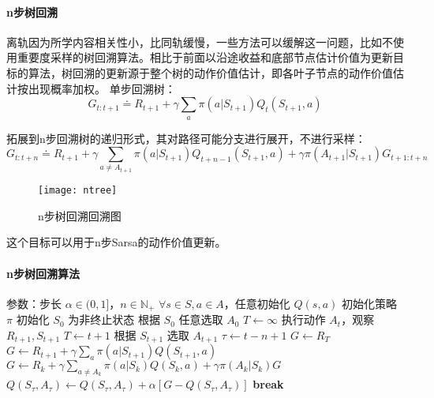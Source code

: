 \documentclass[
12pt, %
a4paper, 
oneside, %
headinclude,footinclude, %
]{scrartcl}
\begin{document}
\paragraph{n步树回溯}
离轨因为所学内容相关性小，比同轨缓慢，一些方法可以缓解这一问题，比如不使用重要度采样的树回溯算法。相比于前面以沿途收益和底部节点估计价值为更新目标的算法，树回溯的更新源于整个树的动作价值估计，即各叶子节点的动作价值估计按出现概率加权。
单步回溯树：
$$ G_{t:t + 1} \doteq R_{t + 1} + \gamma \sum_{a} \pi(a|S_{t + 1}) Q_t(S_{t + 1}, a) $$

拓展到n步回溯树的递归形式，其对路径可能分支进行展开，不进行采样：
$$ G_{t:t + n} \doteq R_{t + 1} + \gamma \sum_{a \neq A_{t + 1}} \pi(a|S_{t + 1}) Q_{t + n - 1}(S_{t + 1}, a) + \gamma \pi(A_{t + 1}|S_{t + 1}) G_{t + 1:t + n} $$

\begin{figure}[H]
\centering
\texttt{[image: ntree]}
\caption[n步树回溯回溯图]{n步树回溯回溯图}
\end{figure}

这个目标可以用于n步Sarsa的动作价值更新。
\paragraph{n步树回溯算法}
\begin{myalgorithm}[n步树回溯算法]
\State 参数：步长 $\alpha \in (0,1]$，$n \in \mathbb{N}_+$
\State $\forall s \in S, a \in A$，任意初始化 $Q(s, a)$
\State 初始化策略 $\pi$
    \State 初始化 $S_0$ 为非终止状态
    \State 根据 $S_0$ 任意选取 $A_0$
    \State $T \gets \infty$
            \State 执行动作 $A_t$，观察 $R_{t+1}, S_{t+1}$
                \State $T \gets t+1$
            \Else
                \State 根据 $S_{t+1}$ 选取 $A_{t+1}$
            \EndIf
        \EndIf
        \State $\tau \gets t-n+1$ 
                \State $G \gets R_T$
            \Else
                \State $G \gets R_{t+1} + \gamma \sum_a \pi(a|S_{t+1})Q(S_{t+1},a)$
            \EndIf
                \State $G \gets R_k + \gamma \sum_{a \neq A_k} \pi(a|S_k)Q(S_k,a) + \gamma \pi(A_k|S_k)G$
            \EndFor
            \State $Q(S_{\tau},A_{\tau}) \gets Q(S_{\tau},A_{\tau}) + \alpha[G - Q(S_{\tau},A_{\tau})]$
        \EndIf
            \State \textbf{break}
        \EndIf
    \EndFor
\EndFor
\end{myalgorithm}
\end{document}

